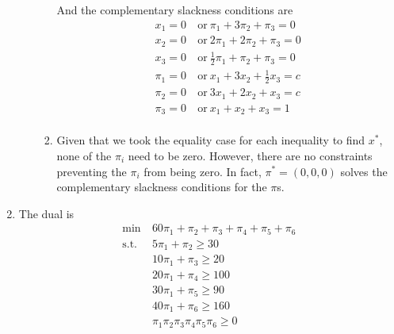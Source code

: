 \documentclass[12pt]{article}
\begin{document}
\begin{enumerate}
\begin{enumerate}
\begin{enumerate}
            And the complementary slackness conditions are
            \begin{equation}
              \begin{split}
                x_1=0&\ \text{or}\ \pi_1+3\pi_2+\pi_3=0\\
                x_2=0&\ \text{or}\ 2\pi_1+2\pi_2+\pi_3=0\\
                x_3=0&\ \text{or}\ \frac{1}{2}\pi_1+\pi_2+\pi_3=0\\
                \pi_1=0&\ \text{or}\ x_1+3x_2+\frac{1}{2}x_3=c\\
                \pi_2=0&\ \text{or}\ 3x_1+2x_2+x_3=c\\
                \pi_3=0&\ \text{or}\ x_1+x_2+x_3=1\\
              \end{split}
            \end{equation}
          \item
            Given that we took the equality case for each inequality to find
            $x^*$, none of the $\pi_i$ need to be zero. However, there are no
            constraints preventing the $\pi_i$ from being zero. In fact,
            $\pi^*=(0,0,0)$ solves the complementary slackness conditions for
            the $\pi$s.
        \end{enumerate}
    \end{enumerate}
  \item
    The dual is
    \begin{equation}
      \begin{split}
        \text{min}\ &60\pi_1+\pi_2+\pi_3+\pi_4+\pi_5+\pi_6\\
        \text{s.t.}\ &5\pi_1+\pi_2\geq30\\
        &10\pi_1+\pi_3\geq20\\
        &20\pi_1+\pi_4\geq100\\
        &30\pi_1+\pi_5\geq90\\
        &40\pi_1+\pi_6\geq160\\
        &\pi_1\pi_2\pi_3\pi_4\pi_5\pi_6\geq0\\
      \end{split}
    \end{equation}


\end{enumerate}
\end{document}
